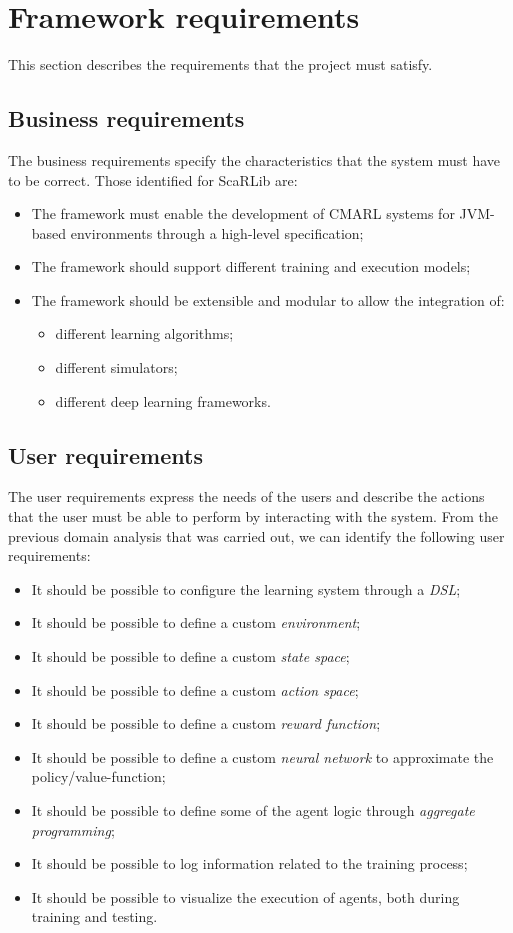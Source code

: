 \documentclass[12pt,a4paper,openright,twoside]{book}
\begin{document}


\section{Framework requirements}
This section describes the requirements that the project must satisfy. 

\subsection*{Business requirements}
The business requirements specify the characteristics that the system must have to be correct. Those identified for ScaRLib are:
\begin{itemize}
    \item The framework must enable the development of CMARL systems for JVM-based environments 
        through a high-level specification;
    \item The framework should support different training and execution models;
    \item The framework should be extensible and modular to allow  the integration of:
    \begin{itemize}
        \item different learning algorithms;
        \item different simulators;
        \item different deep learning frameworks.
    \end{itemize}
\end{itemize}

\subsection*{User requirements}
The user requirements express the needs of the users and describe the actions that the user must be able to perform by interacting with the system.
    From the previous domain analysis that was carried out, we can identify the following user requirements:
\begin{itemize}
    \item It should be possible to configure the learning system through a \emph{DSL};
    \item It should be possible to define a custom \emph{environment};
    \item It should be possible to define a custom \emph{state space};
    \item It should be possible to define a custom \emph{action space};
    \item It should be possible to define a custom \emph{reward function};
    \item It should be possible to define a custom \emph{neural network} to approximate the policy/value-function;
    \item It should be possible to define some of the agent logic through \emph{aggregate programming};
    \item It should be possible to log information related to the training process;
    \item It should be possible to visualize the execution of agents, both during training and testing.
\end{itemize}
\end{document}
